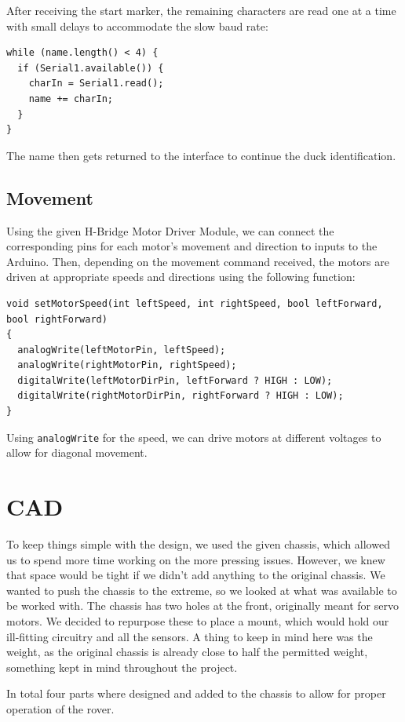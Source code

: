 After receiving the start marker, the remaining characters are read one at a time with small delays to accommodate the slow baud rate:

\begin{verbatim}
while (name.length() < 4) {
  if (Serial1.available()) {
    charIn = Serial1.read();
    name += charIn;
  }
}
\end{verbatim}

The name then gets returned to the interface to continue the duck identification.

\subsection*{Movement}
Using the given H-Bridge Motor Driver Module, we can connect the corresponding pins for each motor’s movement and direction to inputs to the Arduino. Then, depending on the movement command received, the motors are driven at appropriate speeds and directions using the following function:

\begin{verbatim}
void setMotorSpeed(int leftSpeed, int rightSpeed, bool leftForward, 
bool rightForward)
{
  analogWrite(leftMotorPin, leftSpeed);
  analogWrite(rightMotorPin, rightSpeed);
  digitalWrite(leftMotorDirPin, leftForward ? HIGH : LOW);
  digitalWrite(rightMotorDirPin, rightForward ? HIGH : LOW);
}
\end{verbatim}

Using \texttt{analogWrite} for the speed, we can drive motors at different voltages to allow for diagonal movement.

\section{CAD}
To keep things simple with the design, we used the given chassis, which allowed us to spend more time working on the more pressing issues. However, we knew that space would be tight if we didn’t add anything to the original chassis. We wanted to push the chassis to the extreme, so we looked at what was available to be worked with. The chassis has two holes at the front, originally meant for servo motors. We decided to repurpose these to place a mount, which would hold our ill-fitting circuitry and all the sensors. A thing to keep in mind here was the weight, as the original chassis is already close to half the permitted weight, something kept in mind throughout the project.

In total four parts where designed and added to the chassis to allow for proper operation of the rover.

